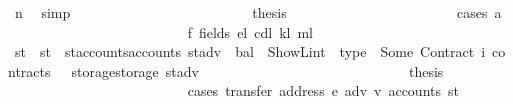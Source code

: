 \begin{isabellebody}
\ n{}\ \isamarkupfalse%
\ simp\isanewline
\ \ \ \ \ \ \ \ \ \ \ \ \ \ \ \ \ \ \ \ \ \ \isamarkupfalse%
\ \isamarkupfalse%
\ {\isacharquery}{\kern0pt}thesis\isanewline
\ \ \ \ \ \ \ \ \ \ \ \ \ \ \ \ \ \ \ \ \ \ \isamarkupfalse%
\ {\isacharparenleft}{\kern0pt}cases\ a{\isacharparenright}{\kern0pt}\isanewline
\ \ \ \ \ \ \ \ \ \ \ \ \ \ \ \ \ \ \ \ \ \ \ \ \isamarkupfalse%
\ f{}{\isacharcolon}{\kern0pt}\ {\isacharparenleft}{\kern0pt}fields\ e\isactrlsub l\ cd\isactrlsub l\ k\isactrlsub l\ m\isactrlsub l{\isacharparenright}{\kern0pt}\isanewline
\ \ \ \ \ \ \ \ \ \ \ \ \ \ \ \ \ \ \ \ \ \ \ \ \isamarkupfalse%
\ st{\isacharprime}{\kern0pt}{\isacharprime}{\kern0pt}{\isacharprime}{\kern0pt}{\isacharprime}{\kern0pt}\ \ {\isachardoublequoteopen}st{\isacharprime}{\kern0pt}{\isacharprime}{\kern0pt}{\isacharprime}{\kern0pt}{\isacharprime}{\kern0pt}\ {\isacharequal}{\kern0pt}\ st{\isacharprime}{\kern0pt}{\isacharprime}{\kern0pt}{\isacharprime}{\kern0pt}{\isasymlparr}accounts{\isacharcolon}{\kern0pt}{\isacharequal}{\kern0pt}{\isacharparenleft}{\kern0pt}accounts\ st{\isacharprime}{\kern0pt}{\isacharprime}{\kern0pt}{\isacharprime}{\kern0pt}{\isacharparenright}{\kern0pt}{\isacharparenleft}{\kern0pt}adv\ {\isacharcolon}{\kern0pt}{\isacharequal}{\kern0pt}\ {\isasymlparr}bal\ {\isacharequal}{\kern0pt}\ ShowL\isactrlsub i\isactrlsub n\isactrlsub t\ {}{\isacharcomma}{\kern0pt}\ type\ {\isacharequal}{\kern0pt}\ Some\ {\isacharparenleft}{\kern0pt}Contract\ i{\isacharparenright}{\kern0pt}{\isacharcomma}{\kern0pt}\ contracts\ {\isacharequal}{\kern0pt}\ {}{\isasymrparr}{\isacharparenright}{\kern0pt}{\isacharcomma}{\kern0pt}\ storage{\isacharcolon}{\kern0pt}{\isacharequal}{\kern0pt}{\isacharparenleft}{\kern0pt}storage\ st{\isacharprime}{\kern0pt}{\isacharprime}{\kern0pt}{\isacharprime}{\kern0pt}{\isacharparenright}{\kern0pt}{\isacharparenleft}{\kern0pt}adv\ {\isacharcolon}{\kern0pt}{\isacharequal}{\kern0pt}\ {\isacharbraceleft}{\kern0pt}{\isachardollar}{\kern0pt}{\isachardollar}{\kern0pt}{\isacharbraceright}{\kern0pt}{\isacharparenright}{\kern0pt}{\isasymrparr}{\isachardoublequoteclose}\isanewline
\ \ \ \ \ \ \ \ \ \ \ \ \ \ \ \ \ \ \ \ \ \ \ \ \isamarkupfalse%
\ \isamarkupfalse%
\ {\isacharquery}{\kern0pt}thesis\isanewline
\ \ \ \ \ \ \ \ \ \ \ \ \ \ \ \ \ \ \ \ \ \ \ \ \isamarkupfalse%
\ {\isacharparenleft}{\kern0pt}cases\ {\isachardoublequoteopen}transfer\ {\isacharparenleft}{\kern0pt}address\ e{\isacharparenright}{\kern0pt}\ adv\ v\ {\isacharparenleft}{\kern0pt}accounts\ st{\isacharprime}{\kern0pt}{\isacharprime}{\kern0pt}{\isacharprime}{\kern0pt}{\isacharprime}{\kern0pt}{\isacharparenright}{\kern0pt}{\isachardoublequoteclose}{\isacharparenright}{\kern0pt}\isanewline

\end{isabellebody}
